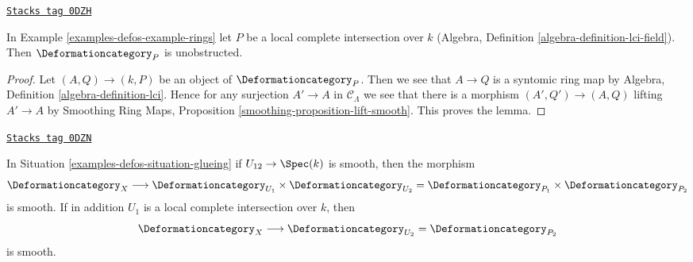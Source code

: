 \begin{lemma}
\label{examples-defos-lemma-lci-unobstructed}
\href{https://stacks.math.columbia.edu/tag/0DZH}{\texttt{Stacks tag 0DZH}}

In Example \ref{examples-defos-example-rings} let $P$ be a local complete
intersection over $k$ (Algebra, Definition \ref{algebra-definition-lci-field}).
Then $\Deformationcategory_P$ is unobstructed.
\end{lemma}

\begin{proof}
Let $(A, Q) \to (k, P)$ be an object of $\Deformationcategory_P$.
Then we see that $A \to Q$ is a syntomic ring map by
Algebra, Definition \ref{algebra-definition-lci}.
Hence for any surjection $A' \to A$ in $\mathcal{C}_\Lambda$
we see that there is a morphism $(A', Q') \to (A, Q)$
lifting $A' \to A$ by
Smoothing Ring Maps, Proposition \ref{smoothing-proposition-lift-smooth}.
This proves the lemma.
\end{proof}

\begin{lemma}
\label{examples-defos-lemma-glueing-smooth}
\href{https://stacks.math.columbia.edu/tag/0DZN}{\texttt{Stacks tag 0DZN}}

In Situation \ref{examples-defos-situation-glueing} if $U_{12} \to \Spec(k)$ is smooth,
then the morphism
$$
\Deformationcategory_X
\longrightarrow
\Deformationcategory_{U_1} \times \Deformationcategory_{U_2} =
\Deformationcategory_{P_1} \times \Deformationcategory_{P_2}
$$
is smooth. If in addition
$U_1$ is a local complete intersection over $k$, then
$$
\Deformationcategory_X
\longrightarrow
\Deformationcategory_{U_2} = \Deformationcategory_{P_2}
$$
is smooth.
\end{lemma}

